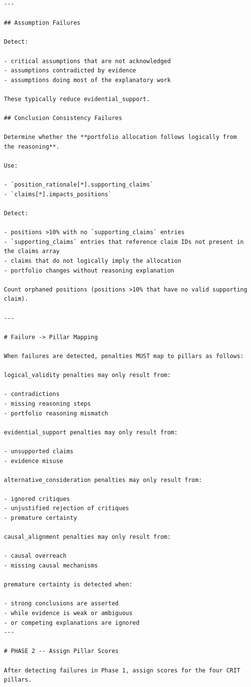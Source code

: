 \documentclass{article}
\begin{document}
\begin{lstlisting}[backgroundcolor=\color{promptbg}]
---

## Assumption Failures

Detect:

- critical assumptions that are not acknowledged
- assumptions contradicted by evidence
- assumptions doing most of the explanatory work

These typically reduce evidential_support.

## Conclusion Consistency Failures

Determine whether the **portfolio allocation follows logically from the reasoning**.

Use:

- `position_rationale[*].supporting_claims`
- `claims[*].impacts_positions`

Detect:

- positions >10% with no `supporting_claims` entries
- `supporting_claims` entries that reference claim IDs not present in the claims array
- claims that do not logically imply the allocation
- portfolio changes without reasoning explanation

Count orphaned positions (positions >10% that have no valid supporting claim).

---

# Failure -> Pillar Mapping

When failures are detected, penalties MUST map to pillars as follows:

logical_validity penalties may only result from:

- contradictions
- missing reasoning steps
- portfolio reasoning mismatch

evidential_support penalties may only result from:

- unsupported claims
- evidence misuse

alternative_consideration penalties may only result from:

- ignored critiques
- unjustified rejection of critiques
- premature certainty

causal_alignment penalties may only result from:

- causal overreach
- missing causal mechanisms

premature certainty is detected when:

- strong conclusions are asserted
- while evidence is weak or ambiguous
- or competing explanations are ignored
---

# PHASE 2 -- Assign Pillar Scores

After detecting failures in Phase 1, assign scores for the four CRIT pillars.


\end{lstlisting}
\end{document}
